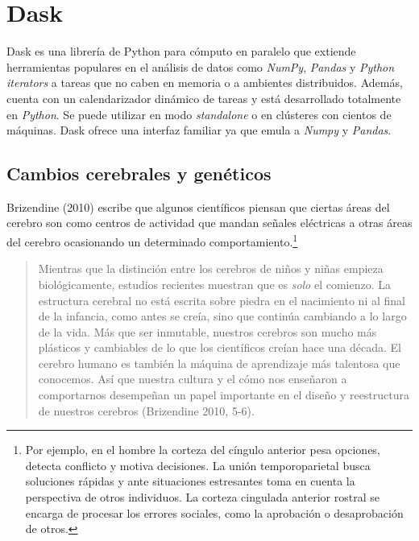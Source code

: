 \section{Dask}

Dask es una librería de Python para cómputo en paralelo que extiende herramientas populares en el análisis de datos como \textit{NumPy}, \textit{Pandas} y \textit{Python iterators} a tareas que no caben en memoria o a ambientes distribuidos. Además, cuenta con un calendarizador dinámico de tareas y está desarrollado totalmente en \textit{Python}. Se puede utilizar en modo \textit{standalone} o en clústeres con cientos de máquinas. Dask ofrece una interfaz familiar ya que emula a \textit{Numpy} y \textit{Pandas}. 

\subsection{Cambios cerebrales y genéticos}

\noindent Brizendine (2010) escribe que algunos científicos piensan que ciertas áreas del cerebro son como centros de actividad que mandan señales eléctricas a otras áreas del cerebro ocasionando un determinado comportamiento.\footnote{ Por ejemplo, en el hombre la corteza del cíngulo anterior pesa opciones, detecta conflicto y motiva decisiones. La unión temporoparietal busca soluciones rápidas y ante situaciones estresantes toma en cuenta la perspectiva de otros individuos. La corteza cingulada anterior rostral se encarga de procesar los errores sociales, como la aprobación o desaprobación de otros.}

\begin{quote}
    \small{Mientras que la distinción entre los cerebros de niños y niñas empieza biológicamente, estudios recientes muestran que es \textit{solo} el comienzo. La estructura cerebral no está escrita sobre piedra en el nacimiento ni al final de la infancia, como antes se creía, sino que continúa cambiando a lo largo de la vida. Más que ser inmutable, nuestros cerebros son mucho más plásticos y cambiables de lo que los científicos creían hace una década. El cerebro humano es también la máquina de aprendizaje más talentosa que conocemos. Así que nuestra cultura y el cómo nos enseñaron a comportarnos desempeñan un papel importante en el diseño y reestructura de nuestros cerebros (Brizendine 2010, 5-6).}
\end{quote}


